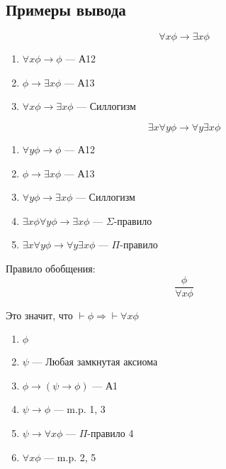 \subsection{Примеры вывода}
\begin{example}
    $$\forall x \phi \rightarrow \exists x \phi$$
    \begin{enumerate}
        \item $\forall x \phi \rightarrow \phi$ --- А12
        \item $\phi \rightarrow \exists x \phi$ --- А13
        \item $\forall x \phi \rightarrow \exists x \phi$ --- Силлогизм
    \end{enumerate}
\end{example}

\begin{example}
    $$\exists x \forall y \phi \rightarrow \forall y \exists x \phi$$
    \begin{enumerate}
        \item $\forall y \phi \rightarrow \phi$ --- А12
        \item $\phi \rightarrow \exists x \phi$ --- А13
        \item $\forall y \phi \rightarrow \exists x \phi$ --- Силлогизм
        \item $\exists x \phi \forall y \phi \rightarrow \exists x \phi$ --- $\Sigma$-правило
        \item $\exists x \forall y \phi \rightarrow \forall y \exists x \phi$ --- $\Pi$-правило
    \end{enumerate}
\end{example}


\begin{example}
    \begin{definition}
        Правило обобщения:
        $$\frac{\phi}{\forall x \phi}$$    
    \end{definition}
    
    Это значит, что $\vdash \phi \Rightarrow \vdash \forall x \phi$
    \begin{enumerate}
        \item $\phi$
        \item $\psi$ --- Любая замкнутая аксиома
        \item $\phi \rightarrow (\psi \rightarrow \phi)$ --- А1
        \item $\psi \rightarrow \phi$ --- m.p. 1, 3
        \item $\psi \rightarrow \forall x \phi$ --- $\Pi$-правило 4
        \item $\forall x \phi$ --- m.p. 2, 5
    \end{enumerate}
\end{example}


